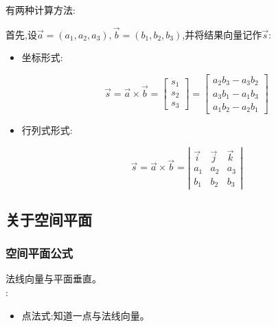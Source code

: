 \documentclass[UTF8]{ctexbook}
\begin{document}
{{{{      有两种计算方法:

      首先,设$\vec{a} = (a_1,a_2,a_3),\vec{b} = (b_1,b_2,b_3)$,并将结果向量记作$\vec{s}$:

      \begin{itemize}
        \item {
              坐标形式:

              $$
                \vec{s}
                =
                \vec{a}\times\vec{b}
                =
                \left[\begin{array}{c}
                    s_1 \\
                    s_2 \\
                    s_3
                  \end{array}\right]
                =
                \left[\begin{matrix}
                    a_2b_3 - a_3b_2 \\
                    a_3b_1 - a_1b_3 \\
                    a_1b_2 - a_2b_1
                  \end{matrix}\right]
              $$
              }
        \item {
              行列式形式:

              $$
                \vec{s}
                =
                \vec{a}\times\vec{b}
                =
                \left|\begin{array}{ccc}
                  \vec{i} & \vec{j} & \vec{k} \\
                  a_1     & a_2     & a_3     \\
                  b_1     & b_2     & b_3
                \end{array}\right|
              $$
              }
      \end{itemize}
    }%

  }%

  \subsection{关于空间平面}{

    \subsubsection{空间平面公式}{
      法线向量与平面垂直。\\

      :
      \begin{itemize}
        \item {
              点法式:知道一点与法线向量。

}
\end{itemize}}}}}
\end{document}
